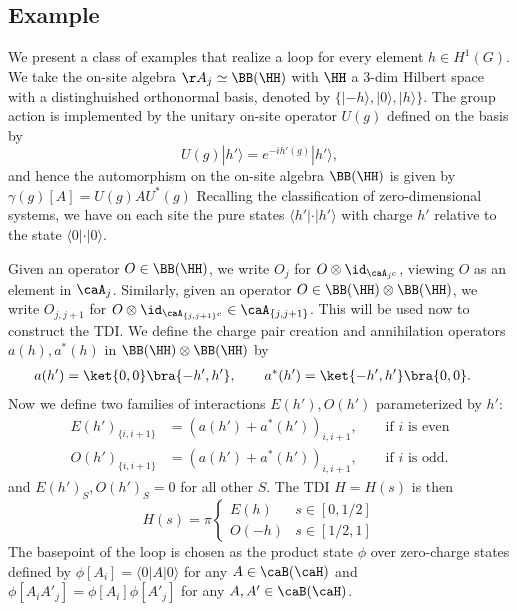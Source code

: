 \subsection{Example}\label{sec: examples}
We present a class of examples that realize a loop for every element $ h \in H^1(G)$.
We take the on-site algebra $\AA_j\simeq \BB(\HH)$ with  $\HH$ a $3$-dim Hilbert space with a distinghuished orthonormal basis, denoted by $\{|-h\rangle,  | 0\rangle,  |h\rangle\}$. The group action is implemented by the unitary on-site operator $U(g)$ defined on the basis by 
\begin{equation}
U(g) | h'\rangle = e^{-i h'(g)}| h'\rangle,
\end{equation}
and hence the automorphism on the on-site algebra $\BB(\HH)$ is given by $\gamma(g)[A]=U(g)AU^*(g)$
Recalling the classification of zero-dimensional systems, we have on each site the pure states $\langle h'| \cdot |h'\rangle$ with charge $h'$ relative to the state $\langle 0| \cdot |0\rangle$. 

Given an operator $ O \in \BB(\HH)$, we write $O_j$ for $O\otimes \id_{\caA_{j^c}}$, viewing $O$ as an element in $\caA_j$. Similarly, given an operator $O \in \BB(\HH) \otimes \BB(\HH) $, we write $O_{j,j+1}$ for $O\otimes \id_{\caA_{\{j,j+1\}^c}}\in\caA_{ \{j,j+1\}  }$. This will be used now to construct the TDI.
We define the charge pair creation and annihilation operators $a(h),a^*(h)$ in $\BB(\HH) \otimes \BB(\HH) $ by 
\begin{align}
a(h')=\ket{0,0}\bra{-h',h'},\qquad  	a^*(h')&=\ket{-h',h'}\bra{0,0}.
\end{align}
Now we define two families of interactions $E(h'),O(h')$ parameterized by $h'$:
\begin{align}
E(h')_{\{i,i+1 \}} & =  (a(h')+a^*(h'))_{i,i+1},\qquad \text{if $i$ is even}     \\
O(h')_{\{i,i+1 \}} & = (a(h')+a^*(h'))_{i,i+1},\qquad \text{if $i$ is odd}  .
\end{align}
and $E(h')_S,O(h')_S=0$ for all other $S$. 
The TDI  $H=H(s)$ is then 
\begin{equation}
H(s)= 	\pi \begin{cases}
E(h)& s\in[0,1/2]\\
O(-h)&s \in[1/2,1]
\end{cases}
\end{equation}
The basepoint of the loop is chosen as the product state $\phi$ over zero-charge states defined by $\phi[A_{i}]  = \langle 0| A |0\rangle$ for any $A \in \caB(\caH)$ and $\phi[A_{i}A'_{j}] =  \phi[A_{i}]  \phi[A'_{j}]$ for any $A,A' \in \caB(\caH)$.

